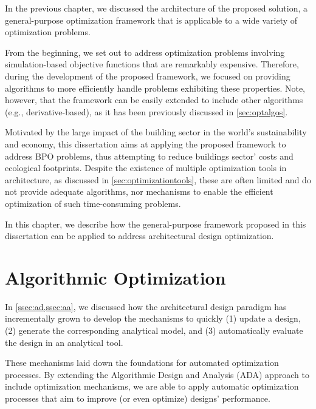 \label{chap:implement}
In the previous chapter, we discussed the architecture of the proposed solution, a general-purpose optimization framework that is applicable to a wide variety of optimization problems. 

From the beginning, we set out to address optimization problems involving simulation-based objective functions that are remarkably expensive. Therefore, during the development of the proposed framework, we focused on providing algorithms to more efficiently handle problems exhibiting these properties. Note, however, that the framework can be easily extended to include other algorithms (e.g., derivative-based), as it has been previously discussed in \cref{sec:optalgos}. 

Motivated by the large impact of the building sector in the world's sustainability and economy, this dissertation aims at applying the proposed framework to address \ac{BPO} problems, thus attempting to reduce buildings sector' costs and ecological footprints. Despite the existence of multiple optimization tools in architecture, as discussed in \cref{sec:optimizationtools}, these are often limited and do not provide adequate algorithms, nor mechanisms to enable the efficient optimization of such time-consuming problems.

In this chapter, we describe how the general-purpose framework proposed in this dissertation can be applied to address architectural design optimization. 

\section{Algorithmic Optimization}
In \cref{ssec:ad,ssec:aa}, we discussed how the architectural design paradigm has incrementally grown to develop the mechanisms to quickly (1) update a design, (2) generate the corresponding analytical model, and (3) automatically evaluate the design in an analytical tool.%

These mechanisms laid down the foundations for automated optimization processes. By extending the Algorithmic Design and Analysis (\ac{ADA}) approach to include optimization mechanisms, we are able to apply automatic optimization processes that aim to improve (or even optimize) designs' performance. 

